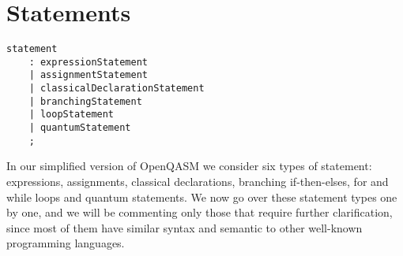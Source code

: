 \documentclass[12pt,a4paper]{report}
\theoremstyle{definition}
\theoremstyle{definition}
\theoremstyle{definition}
\begin{document}
\section{Statements}
\begin{lstlisting}
statement
    : expressionStatement
    | assignmentStatement
    | classicalDeclarationStatement
    | branchingStatement
    | loopStatement
    | quantumStatement
    ;
\end{lstlisting}
In our simplified version of OpenQASM we consider six types of statement: expressions, assignments, classical declarations, branching if-then-elses, for and while loops and quantum statements. We now go over these statement types one by one, and we will be commenting only those that require further clarification, since most of them have similar syntax and semantic to other well-known programming languages.\\
\end{document}
